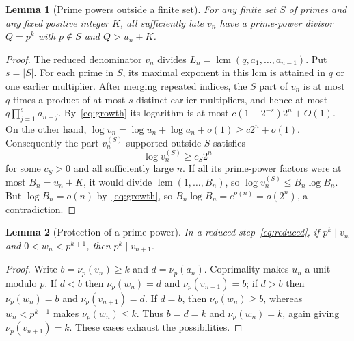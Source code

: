\documentclass[11pt]{article}
\newtheorem{lemma}{Lemma}
\begin{document}
\begin{lemma}[Prime powers outside a finite set]\label{lem:supply}
For any finite set $S$ of primes and any fixed positive integer $K$,
all sufficiently late $v_n$ have a prime-power divisor $Q=p^k$ with
$p\notin S$ and $Q>u_n+K$.
\end{lemma}
\begin{proof}
The reduced denominator $v_n$ divides
$L_n=\operatorname{lcm}(q,a_1,\ldots,a_{n-1})$. Put $s=|S|$.
For each prime in $S$, its maximal exponent in this lcm is attained
in $q$ or one earlier multiplier. After merging repeated indices, the
$S$ part of $v_n$ is at most $q$ times a product of at most $s$
distinct earlier multipliers, and hence at most
$q\prod_{j=1}^s a_{n-j}$. By~\eqref{eq:growth} its logarithm is at most
$c(1-2^{-s})2^n+O(1)$. On the other hand,
$\log v_n=\log u_n+\log a_n+o(1)\ge c2^n+o(1)$.
Consequently the part $v_n^{(S)}$ supported outside $S$ satisfies
\[
 \log v_n^{(S)}\ge c_S2^n
\]
for some $c_S>0$ and all sufficiently large $n$.
If all its prime-power factors were at most $B_n=u_n+K$, it would
divide $\operatorname{lcm}(1,\ldots,B_n)$, so
$\log v_n^{(S)}\le B_n\log B_n$. But
$\log B_n=o(n)$ by~\eqref{eq:growth}, so
$B_n\log B_n=e^{o(n)}=o(2^n)$, a contradiction.
\end{proof}

\begin{lemma}[Protection of a prime power]\label{lem:protect}
In a reduced step~\eqref{eq:reduced}, if $p^k\mid v_n$ and
$0<w_n<p^{k+1}$, then $p^k\mid v_{n+1}$.
\end{lemma}
\begin{proof}
Write $b=\nu_p(v_n)\ge k$ and $d=\nu_p(a_n)$. Coprimality makes
$u_n$ a unit modulo $p$. If $d<b$ then $\nu_p(w_n)=d$ and
$\nu_p(v_{n+1})=b$; if $d>b$ then
$\nu_p(w_n)=b$ and $\nu_p(v_{n+1})=d$. If $d=b$, then
$\nu_p(w_n)\ge b$, whereas $w_n<p^{k+1}$ makes
$\nu_p(w_n)\le k$. Thus $b=d=k$ and $\nu_p(w_n)=k$, again giving
$\nu_p(v_{n+1})=k$. These cases exhaust the possibilities.
\end{proof}
\end{document}
